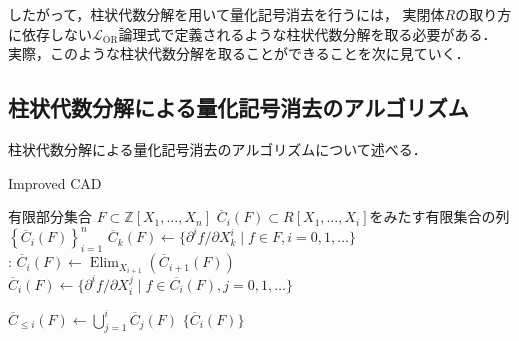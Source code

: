 \documentclass[uplatex, dvipdfmx]{jsarticle}
\numberwithin{equation}{section}
\newcommand{\Z}{\mathbb{Z}}
\DeclareMathOperator{\Elim}{Elim}
\theoremstyle{definition}
\newtheorem{proposition}[definition]{命題}
\begin{document}
したがって，柱状代数分解を用いて量化記号消去を行うには，
実閉体$R$の取り方に依存しない$\mathcal{L}_\mathrm{OR}$論理式で定義されるような柱状代数分解を取る必要がある．
実際，このような柱状代数分解を取ることができることを次に見ていく．


\subsection{柱状代数分解による量化記号消去のアルゴリズム} 

柱状代数分解による量化記号消去のアルゴリズムについて述べる．




\begin{algorithm}
     \caption{Improved CAD}\label{Improved CAD}
     \begin{algorithmic}[1]
          \REQUIRE 
               有限部分集合
               $F \subset \Z[X_1, \dots, X_n]$
          \ENSURE
               $\overline{C}_i(F) \subset R[X_1, \dots, X_i]$をみたす有限集合の列$\left\{\overline{C}_i(F)\right\}_{i=1}^n$
          \STATE $\overline{C}_k(F)\leftarrow \{\partial^i f/ \partial X_k^i \mid f \in F, i=0,1,\dots \}$
          \\ :
               \STATE $\overline{C}_i(F) \leftarrow \Elim_{X_{i+1}}(\overline{C}_{i+1}(F))$
               \STATE $\overline{C}_i(F) \leftarrow \{ \partial^i f/ \partial X_i^j \mid f \in  \overline{C_i}(F), j=0,1, \dots\}$
          \ENDFOR

               \STATE $\overline{C}_{\leq i}(F) \leftarrow \bigcup_{j=1}^i \overline{C}_j(F)$
          \ENDFOR
          \RETURN $\{\overline{C}_i(F)\}$
     \end{algorithmic}
\end{algorithm}
\end{document}

